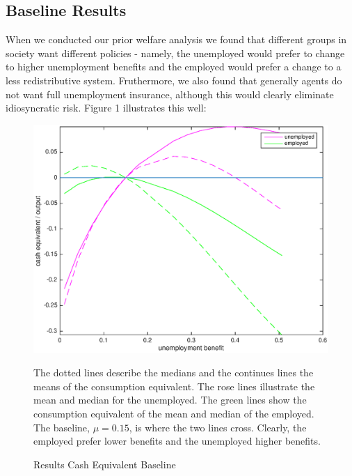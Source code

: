 \documentclass[a4paper,12pt]{article}
\begin{document}
\subsection{Baseline Results}

When we conducted our prior welfare analysis we found that different groups in society want different policies - namely, the unemployed would prefer to change to higher unemployment benefits and the employed would prefer a change to a less redistributive system. Fruthermore, we also found that generally agents do not want full unemployment insurance, although this would clearly eliminate idiosyncratic risk. 
Figure 1 illustrates this well: 

\begin{figure}
\caption{Results Cash Equivalent Baseline } 
\label{baseline_ue_vs_e}	%
\centering
\includegraphics[scale=.7]{Cash_equivalent_baseline}  %

\begin{minipage}{0.8\linewidth}
\footnotesize{The dotted lines describe the medians and the continues lines the means of the consumption equivalent. The rose lines illustrate the mean and median for the unemployed. The green lines show the consumption equivalent of the mean and median of the employed. The baseline, $\mu = 0.15$, is where the two lines cross. Clearly, the employed prefer lower benefits and the unemployed higher benefits. }
\end{minipage}

\end{figure}
\end{document}
